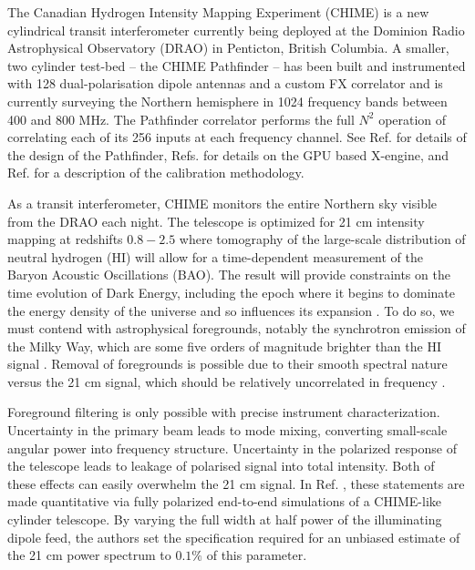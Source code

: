 The Canadian Hydrogen Intensity Mapping Experiment (CHIME) is a new cylindrical transit interferometer currently being deployed at the Dominion Radio Astrophysical Observatory (DRAO) in Penticton, British Columbia. A smaller, two cylinder test-bed -- the CHIME Pathfinder -- has been built and instrumented with 128 dual-polarisation dipole antennas and a custom FX correlator and is currently surveying the Northern hemisphere in 1024 frequency bands between 400 and 800 MHz. The Pathfinder correlator performs the full $N^2$ operation of correlating each of its 256 inputs at each frequency channel. See Ref. \citep{chimepath1} for details of the design of the Pathfinder, Refs. \citep{xeng1, xeng2, xeng3} for details on the GPU based X-engine, and Ref. \citep{chimepath2} for a description of the calibration methodology.

As a transit interferometer, CHIME monitors the entire Northern sky visible from the DRAO each night. The telescope is optimized for 21 cm intensity mapping at redshifts $0.8-2.5$ where tomography of the large-scale distribution of neutral hydrogen (HI) will allow for a time-dependent measurement of the Baryon Acoustic Oscillations (BAO). The result will provide constraints on the time evolution of Dark Energy, including the epoch where it begins to dominate the energy density of the universe and so influences its expansion \citep{furl, moraleswyithe, bao1}. To do so, we must contend with astrophysical foregrounds, notably the synchrotron emission of the Milky Way, which are some five orders of magnitude brighter than the HI signal \citep{santoscoorayknox}. Removal of foregrounds is possible due to their smooth spectral nature versus the 21 cm signal, which should be relatively uncorrelated in frequency \citep{santoscoorayknox, mmodes1, mmodes2}. 

Foreground filtering is only possible with precise instrument characterization. Uncertainty in the primary beam leads to mode mixing, converting small-scale angular power into frequency structure. Uncertainty in the polarized response of the telescope leads to leakage of polarised signal into total intensity. Both of these effects can easily overwhelm the 21 cm signal. In Ref. \citep{mmodes2}, these statements are made quantitative via fully polarized end-to-end simulations of a CHIME-like cylinder telescope. By varying the full width at half power of the illuminating dipole feed, the authors set the specification required for an unbiased estimate of the 21 cm power spectrum to $0.1\%$ of this parameter.

